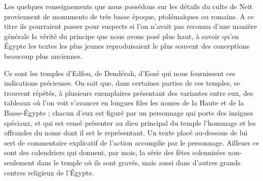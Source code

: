 \documentclass[a4paper, 11pt, oneside]{article}
\begin{document}
Les quelques renseignements que nous possédons sur les détails du culte de Neit proviennent de monuments de très basse époque, ptolémaïques ou romains. A ce titre ils pourraient passer pour suspects si l'on n'avait pas reconnu d'une manière générale la vérité du principe que nous avons posé plus haut, à savoir qu'en Égypte les textes les plus jeunes reproduisaient le plus souvent des conceptions beaucoup plus anciennes.

Ce sont les temples d'Edfou, de Dendérah, d'Esné qui nous fournissent ces indications précieuses. On sait que, dans certaines parties de ces temples, se trouvent répétés, à plusieurs exemplaires présentant des variantes entre eux, des tableaux où l'on voit s'avancer en longues files les nomes de la Haute et de la Basse-Égypte ; chacun d'eux est figuré par un personnage qui porte des insignes spéciaux, et qui est censé présenter au dieu principal du temple l'hommage et les offrandes du nome dont il est le représentant. Un texte placé au-dessous de lui sert de commentaire explicatif de l'action accomplie par le personnage. Ailleurs ce sont des calendriers qui donnent, par mois, la série des fêtes solennisées non-seulement dans le temple où ils sont gravés, mais aussi dans d'autres grands centres religieux de l'Égypte.
\end{document}
